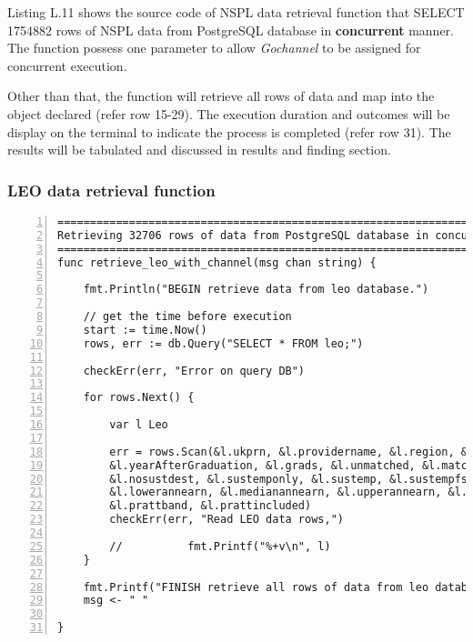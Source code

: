 Listing L.11 shows the source code of NSPL data retrieval function that SELECT 1754882 rows of NSPL data from PostgreSQL database in \textbf{concurrent} manner. The function possess one parameter to allow \textit{Gochannel} to be assigned for concurrent execution. 

Other than that, the function will retrieve all rows of data and map into the object declared (refer row 15-29). The execution duration and outcomes will be display on the terminal to indicate the process is completed (refer row 31). The results will be tabulated and discussed in results and finding section. 

\newpage

\subsubsection{LEO data retrieval function}

\lstset{basicstyle=\ttfamily\tiny}  
\begin{lstlisting}[breaklines, frame=single, numbers=left, caption={Function for LEO data retrieval. (retrieve\_leo.go)}, label=commandline-02]
=============================================================================
Retrieving 32706 rows of data from PostgreSQL database in concurrent manner
=============================================================================
func retrieve_leo_with_channel(msg chan string) {

	fmt.Println("BEGIN retrieve data from leo database.")
	
	// get the time before execution
	start := time.Now()
	rows, err := db.Query("SELECT * FROM leo;")
	
	checkErr(err, "Error on query DB")	
	
	for rows.Next() {
	
		var l Leo
		
		err = rows.Scan(&l.ukprn, &l.providername, &l.region, &l.subject, &l.sex,
		&l.yearAfterGraduation, &l.grads, &l.unmatched, &l.matched, &l.activitynocaptured,
		&l.nosustdest, &l.sustemponly, &l.sustemp, &l.sustempfsorboth, &l.earningsinclude,
		&l.lowerannearn, &l.medianannearn, &l.upperannearn, &l.polargrpone, &l.polargrponeincluded,
		&l.prattband, &l.prattincluded)
		checkErr(err, "Read LEO data rows,")
		
		//			fmt.Printf("%+v\n", l)
	}
	
	fmt.Printf("FINISH retrieve all rows of data from leo database with %.5fs seconds. ", time.Since(start).Seconds())
	msg <- " " 

}

\end{lstlisting}

